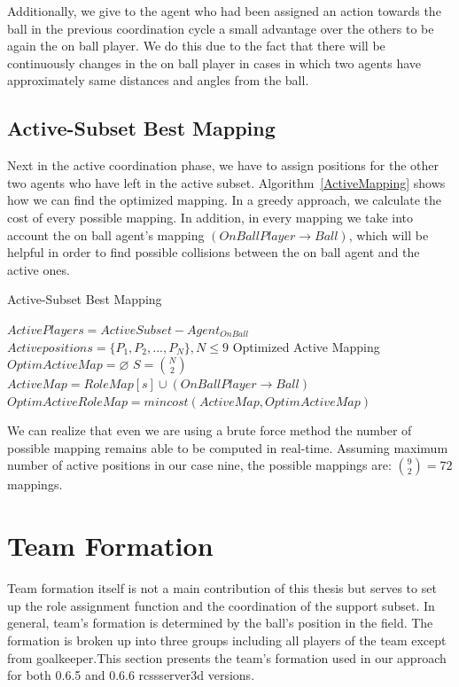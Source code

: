 Additionally, we give to the agent who had been assigned an action towards the ball in the previous coordination cycle a small advantage over the others to be again the on ball player. We do this due to the fact that there will be continuously changes in the on ball player in cases in which two agents have approximately same distances and angles from the ball.



\subsection{Active-Subset Best Mapping}
Next in the active coordination phase, we have to assign positions for the other two agents who have left in the active subset. Algorithm~\ref{ActiveMapping} shows how we can find the optimized mapping. In a greedy approach, we calculate the cost of every possible mapping. In addition, in every mapping we take into account the on ball agent's mapping $(OnBallPlayer \rightarrow Ball)$, which will be helpful in order to find possible collisions between the on ball agent and the active ones.

\begin{algorithm}[ht!]
\caption{Active-Subset Best Mapping}
\label{ActiveMapping}
\begin{algorithmic}[1]
$ActivePlayers = ActiveSubset - Agent_{OnBall} $
$Activepositions = \lbrace P_{1},P_{2},...,P_{N} \rbrace, N\leq 9 $
Optimized Active Mapping
\STATE $OptimActiveMap = \varnothing $
\STATE $S = {{N}\choose{2}}$
\STATE $ActiveMap = RoleMap[s] \cup (OnBallPlayer \rightarrow Ball)$
\STATE $OptimActiveRoleMap = mincost(ActiveMap,OptimActiveMap)$
\ENDFOR
\end{algorithmic}
\end{algorithm}
We can realize that even we are using a brute force method the number of possible mapping remains able to be computed in real-time. Assuming maximum number of active positions in our case nine, the possible mappings are: ${{9}\choose{2}} = 72$ mappings.

\section{Team Formation}
Team formation itself is not a main contribution of this thesis but serves to set up the role assignment function and the coordination of the support subset. In general, team's formation is determined by the ball's position in the field. The formation is broken up into three groups including all players of the team except from goalkeeper.This section presents the team's formation used in our approach for both 0.6.5 and 0.6.6 rcssserver3d versions.
